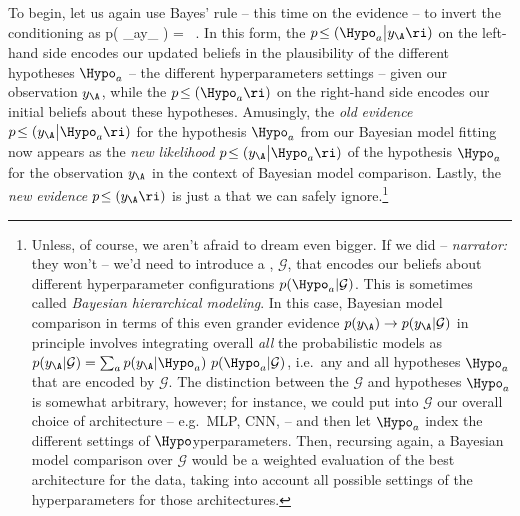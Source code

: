 To begin, let us again use Bayes' rule -- this time on the evidence -- to invert the conditioning as
\be\label{eq:bayes-rule-model-comparison}
p\!\le( \Hypo_{a}\big\vert y_{\A}  \ri) =  \, .
\ee
In this form, the  $p\!\le( \Hypo_{a}\big\vert y_{\A}  \ri) $ on the left-hand side encodes our updated beliefs in the plausibility of the different hypotheses  $\Hypo_{a}$ -- the different hyperparameters settings -- given our observation $y_{\A}$, while the  $p\!\le( \Hypo_a \ri)$ on the right-hand side encodes our initial beliefs about 
these hypotheses. 
Amusingly,  the \emph{old} \emph{evidence} $p\!\le(y_{\A}\big\vert \Hypo_{a}\ri)$ for the hypothesis $\Hypo_{a}$ from our Bayesian model fitting
now appears as the \emph{new} \emph{likelihood} $p\!\le(y_{\A}\big\vert \Hypo_{a}\ri)$ of the hypothesis $\Hypo_{a}$ for the observation $y_{\A}$ in the context of Bayesian model comparison. Lastly, the \emph{new} \emph{evidence} $p\!\le( y_{\A}\ri)$  
is just a  that we can safely ignore.\footnote{
    Unless, of course, we aren't afraid to dream even bigger.
    If we did -- \emph{narrator:} they won't -- 
    we'd need to introduce a ,  $\mathcal{G}$, that encodes our  beliefs about different hyperparameter configurations $p(\Hypo_{a}  \vert\mathcal{G})$. This is sometimes called \emph{Bayesian hierarchical modeling}.
    In this case, Bayesian model comparison in terms of this even grander evidence $p( y_{\A}) \to p( y_{\A}\vert\mathcal{G})$  in principle involves integrating overall \emph{all} the probabilistic models as $p( y_{\A}\vert\mathcal{G})=\sum_{a}p(y_{\A}\vert \Hypo_{a})\ p(\Hypo_{a}\vert\mathcal{G})$,  i.e.~any and all hypotheses $\Hypo_{a}$ that are encoded by $\mathcal{G}$. 
    The distinction between the  $\mathcal{G}$ and hypotheses $\Hypo_{a}$ is somewhat arbitrary, however; for instance, we could put into $\mathcal{G}$ our overall choice of architecture -- e.g.~MLP, CNN,  -- and then let $\Hypo_{a}$ index the different settings of $\Hypo$yperparameters. Then, recursing again, a Bayesian model comparison over $\mathcal{G}$ would be a weighted evaluation of the best architecture for the data, taking into account all possible settings of the hyperparameters for those architectures.
}








